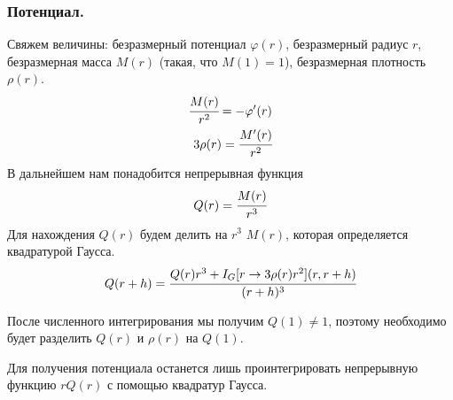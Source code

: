	\subsubsection{Потенциал.}
	Свяжем величины: безразмерный потенциал $\varphi(r)$, безразмерный радиус $r$, безразмерная масса $M(r)$ (такая, что $M(1) = 1$), безразмерная плотность $\rho(r)$.
	\begin{eqnarray*}
		\cfrac{M(r)}{r^2} = -\varphi'(r) \\
		3\rho(r) = \cfrac{M'(r)}{r^2}
	\end{eqnarray*}
	В дальнейшем нам понадобится непрерывная функция 
	\begin{equation}
		Q(r) = \cfrac{M(r)}{r^3}
	\end{equation}	
	Для нахождения $Q(r)$ будем делить на $r^3$ $M(r)$, которая определяется квадратурой Гаусса.
	\begin{equation}
		Q(r+h) = \cfrac{Q(r)r^3 + I_G[r \rightarrow  3\rho(r)r^2](r,r+h)}{(r+h)^3}
	\end{equation}
	
	После численного интегрирования мы получим $Q(1) \ne 1$, поэтому необходимо будет разделить $Q(r)$ и $\rho(r)$ на $Q(1)$.
	
	Для получения потенциала останется лишь проинтегрировать непрерывную функцию $rQ(r)$ с помощью квадратур Гаусса.
	
